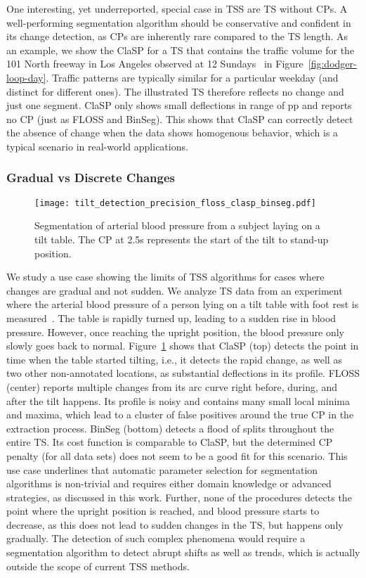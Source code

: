 \documentclass[pdflatex,sn-basic]{sn-jnl}
\begin{document}
One interesting, yet underreported, special case in TSS are TS without CPs. A well-performing segmentation algorithm should be conservative and confident in its change detection, as CPs are inherently rare compared to the TS length. As an example, we show the ClaSP for a TS that contains the traffic volume for the 101 North freeway in Los Angeles observed at 12 Sundays~\citep{Ihler2006AdaptiveED} in Figure~\ref{fig:dodger-loop-day}. Traffic patterns are typically similar for a particular weekday (and distinct for different ones). The illustrated TS therefore reflects no change and just one segment. ClaSP only shows small deflections in range of  pp and reports no CP (just as FLOSS and BinSeg). This shows that ClaSP can correctly detect the absence of change when the data shows homogenous behavior, which is a typical scenario in real-world applications.

\subsubsection*{Gradual vs Discrete Changes}

\begin{figure}[t]
	\texttt{[image: tilt\_detection\_precision\_floss\_clasp\_binseg.pdf]}
	\caption{Segmentation of arterial blood pressure from a subject laying on a tilt table. The CP at 2.5s represents the start of the tilt to stand-up position.\label{fig:tilt-abp}
	}
\end{figure}

We study a use case showing the limits of TSS algorithms for cases where changes are gradual and not sudden. We analyze TS data from an experiment where the arterial blood pressure of a person lying on a tilt table with foot rest is measured~\citep{heldt2003circulatory}. The table is rapidly turned up, leading to a sudden rise in blood pressure. However, once reaching the upright position, the blood pressure only slowly goes back to normal. Figure~\ref{fig:tilt-abp} shows that ClaSP (top) detects the point in time when the table started tilting, i.e., it detects the rapid change, as well as two other non-annotated locations, as substantial deflections in its profile. FLOSS (center) reports multiple changes from its arc curve right before, during, and after the tilt happens. Its profile is noisy and contains many small local minima and maxima, which lead to a cluster of false positives around the true CP in the extraction process. BinSeg (bottom) detects a flood of splits throughout the entire TS. Its cost function is comparable to ClaSP, but the determined CP penalty (for all data sets) does not seem to be a good fit for this scenario. This use case underlines that automatic parameter selection for segmentation algorithms is non-trivial and requires either domain knowledge or advanced strategies, as discussed in this work. Further, none of the procedures detects the point where the upright position is reached, and blood pressure starts to decrease, as this does not lead to sudden changes in the TS, but happens only gradually. The detection of such complex phenomena would require a segmentation algorithm to detect abrupt shifts as well as trends, which is actually outside the scope of current TSS methods.
\end{document}
